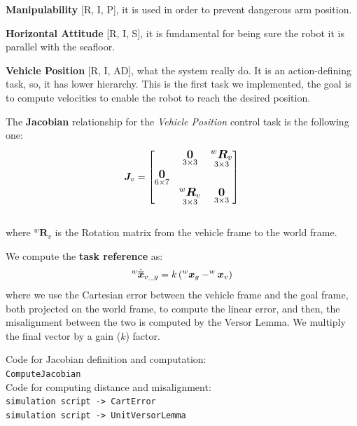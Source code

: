 \documentclass{article}
\begin{document}
\noindent
\begin{description}
	\item \textbf{Manipulability} [R, I, P], it is used in order to prevent dangerous arm position.
	\item \textbf{Horizontal Attitude} [R, I, S], it is fundamental for being sure the robot it is parallel with the seafloor. 
	\item \textbf{Vehicle Position} [R, I, AD], what the system really do. It is an action-defining task, so, it has lower hierarchy. This is the first task we implemented, the goal is to compute velocities to enable the robot to reach the desired position.
\end{description}

\noindent
\vspace{5px}
The \textbf{Jacobian} relationship for the \textit{Vehicle Position} control task is the following one:
\begin{equation}
\large
    \boldsymbol{J}_v = \begin{bmatrix}
 & \underset{3\times3}{\boldsymbol{0}} & \underset{3\times3}{^{w}\boldsymbol{R}_{v}} \\
\underset{6\times7}{\boldsymbol{0}} \\
& \underset{ 3\times 3}{^{w}\boldsymbol{R}_{v}} & \underset{3\times 3}{\boldsymbol{0}} \\
\end{bmatrix}
\end{equation}
\\ 
where ${^{w}\boldsymbol{R}_{v}}$ is the Rotation matrix from the vehicle frame to the world frame.

\noindent
\vspace{5px}
We compute the \textbf{task reference} as:
\begin{equation}
\large
    ^{w}\dot{\overline{\boldsymbol{x}}}_{v\_g}=k\left(^{w} \boldsymbol{x}_{g}-^{w} \boldsymbol{x}_{v}\right)
\end{equation}
where we use the Cartesian error between the vehicle frame and the goal frame, both projected on the world frame, to compute the linear error, and then, the misalignment between the two is computed by the Versor Lemma. We multiply the final vector by a gain ($k$) factor.

\colorbox{mygray}{\parbox{0.9\textwidth}{
Code for Jacobian definition and computation: \\
\texttt{ComputeJacobian}\\
Code for computing distance and misalignment: \\
\texttt{simulation script -> CartError} \\
\texttt{simulation script -> UnitVersorLemma}
}}
\end{document}
